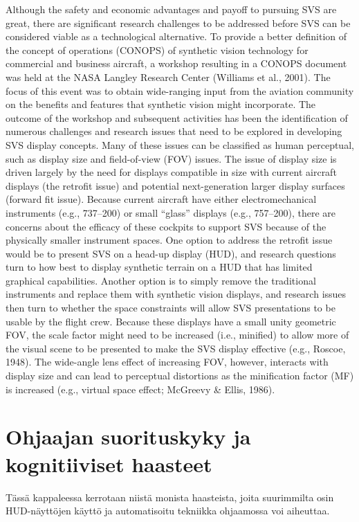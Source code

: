 \documentclass[utf8,bachelor,manualbib]{gradu3}
\begin{document}
Although the safety and economic advantages and payoff to pursuing SVS are
great, there are significant research challenges to be addressed before SVS can be
considered viable as a technological alternative. To provide a better definition of
the concept of operations (CONOPS) of synthetic vision technology for commercial
and business aircraft, a workshop resulting in a CONOPS document was held
at the NASA Langley Research Center (Williams et al., 2001). The focus of this
event was to obtain wide-ranging input from the aviation community on the benefits
and features that synthetic vision might incorporate. The outcome of the workshop
and subsequent activities has been the identification of numerous challenges
and research issues that need to be explored in developing SVS display concepts.
Many of these issues can be classified as human perceptual, such as display size
and field-of-view (FOV) issues.
The issue of display size is driven largely by the need for displays compatible in
size with current aircraft displays (the retrofit issue) and potential next-generation
larger display surfaces (forward fit issue). Because current aircraft have either
electromechanical instruments (e.g., 737–200) or small “glass” displays (e.g.,
757–200), there are concerns about the efficacy of these cockpits to support SVS
because of the physically smaller instrument spaces. One option to address the retrofit
issue would be to present SVS on a head-up display (HUD), and research
questions turn to how best to display synthetic terrain on a HUD that has limited
graphical capabilities. Another option is to simply remove the traditional instruments
and replace them with synthetic vision displays, and research issues then
turn to whether the space constraints will allow SVS presentations to be usable by the flight crew. Because these displays have a small unity geometric FOV, the scale
factor might need to be increased (i.e., minified) to allow more of the visual scene
to be presented to make the SVS display effective (e.g., Roscoe, 1948). The
wide-angle lens effect of increasing FOV, however, interacts with display size and
can lead to perceptual distortions as the minification factor (MF) is increased (e.g.,
virtual space effect; McGreevy \& Ellis, 1986). \citep{prinzel2004}

\section{Ohjaajan suorituskyky ja kognitiiviset haasteet}

Tässä kappaleessa kerrotaan niistä monista haasteista, joita suurimmilta osin HUD-näyttöjen käyttö ja automatisoitu tekniikka ohjaamossa voi aiheuttaa.
\end{document}
